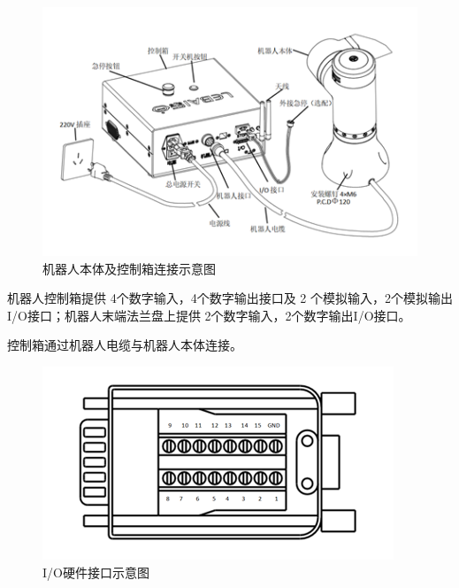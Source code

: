\begin{figure}[ht]
    \centering
    \includegraphics{image/1-2-host.png}
    \caption{机器人本体及控制箱连接示意图}
\end{figure}

机器人控制箱提供 4个数字输入，4个数字输出接口及 2 个模拟输入，2个模拟输出I/O接口；机器人末端法兰盘上提供 2个数字输入，2个数字输出I/O接口。

控制箱通过机器人电缆与机器人本体连接。

\begin{figure}[ht]
    \centering
    \includegraphics{image/1-3-io.png}
    \caption{I/O硬件接口示意图}
\end{figure}

